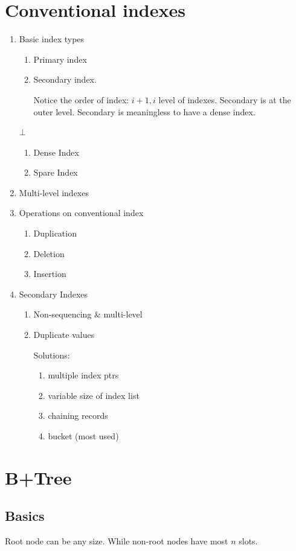 \documentclass[a4paper]{report}
\begin{document}
\section{Conventional indexes}
\begin{enumerate}
\item Basic index types
  \begin{enumerate}
  \item Primary index
  \item Secondary index. 

  Notice the order of index: $i+1, i$ level of indexes. Secondary is at the outer level. Secondary is meaningless to have a dense index. 
  
  
  
  \end{enumerate}
  $\bot$
  \begin{enumerate}
  \item Dense Index
  \item Spare Index
  \end{enumerate}
\item Multi-level indexes
\item Operations on conventional index
  \begin{enumerate}
  \item Duplication
  \item Deletion
  \item Insertion
  \end{enumerate}
\item Secondary Indexes
  \begin{enumerate}
  \item Non-sequencing \& multi-level
  \item Duplicate values
  
  Solutions:
    \begin{enumerate}
    \item multiple index ptrs
    \item variable size of index list 
    \item chaining records 
    \item bucket (most used)
    \end{enumerate}
  \end{enumerate}
\end{enumerate}
\section{B+Tree}
\subsection{Basics}
Root node can be any size. While non-root nodes have most $n$ slots.
\end{document}

